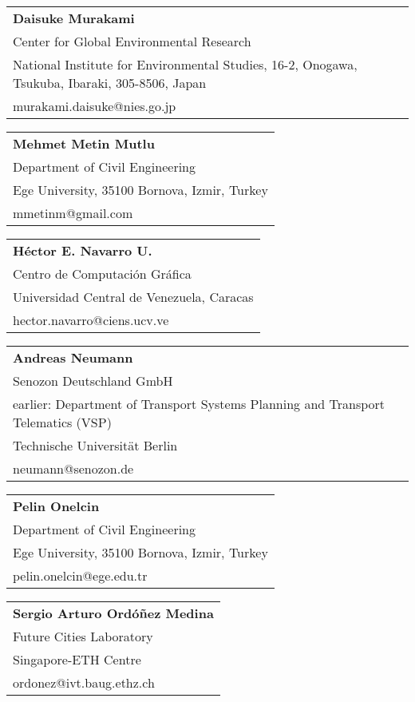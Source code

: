 \begin{tabular}[width=0.48\textwidth]{@{}l}
\textbf{Daisuke Murakami} \\
Center for Global Environmental Research \\
National Institute for Environmental Studies, 16-2, Onogawa, Tsukuba, Ibaraki, 305-8506, Japan \\
murakami.daisuke@nies.go.jp  \\
\end{tabular}

\begin{tabular}[width=0.48\textwidth]{@{}l}
\textbf{Mehmet Metin Mutlu} \\
Department of Civil Engineering \\
Ege University, 35100 Bornova, Izmir, Turkey \\
mmetinm@gmail.com \\
\end{tabular}

\begin{tabular}[width=0.48\textwidth]{@{}l}
\textbf{Héctor E. Navarro U.} \\
Centro de Computación Gráfica \\
Universidad Central de Venezuela, Caracas \\
hector.navarro@ciens.ucv.ve \\
\end{tabular}

\begin{tabular}[width=0.48\textwidth]{@{}l}
\textbf{Andreas Neumann} \\
Senozon Deutschland GmbH \\
earlier: Department of Transport Systems Planning and Transport Telematics (VSP) \\
Technische Universität Berlin \\
neumann@senozon.de \\
\end{tabular}

\begin{tabular}[width=0.48\textwidth]{@{}l}
\textbf{Pelin Onelcin} \\
Department of Civil Engineering \\
Ege University, 35100 Bornova, Izmir, Turkey \\
pelin.onelcin@ege.edu.tr \\
\end{tabular}

\begin{tabular}[width=0.48\textwidth]{@{}l}
\textbf{Sergio Arturo Ordóñez Medina} \\
Future Cities Laboratory \\
Singapore-ETH Centre\\
ordonez@ivt.baug.ethz.ch \\
\end{tabular}

